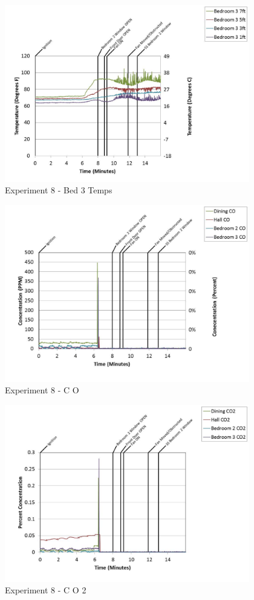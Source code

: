 \documentclass{article}
\begin{document}
\begin{appendices}
	\clearpage

	\begin{figure}[h!]
		\centering
		\includegraphics[height=3.05in]{0_Images/Results_Charts/Exp_8_Charts/Bed3Temps.pdf}
		\caption{Experiment 8 - Bed 3 Temps}
	\end{figure}
 

	\begin{figure}[h!]
		\centering
		\includegraphics[height=3.05in]{0_Images/Results_Charts/Exp_8_Charts/CO.pdf}
		\caption{Experiment 8 - C O}
	\end{figure}
 
	\clearpage

	\begin{figure}[h!]
		\centering
		\includegraphics[height=3.05in]{0_Images/Results_Charts/Exp_8_Charts/CO2.pdf}
		\caption{Experiment 8 - C O 2}
	\end{figure}
 


\end{appendices}
\end{document}

